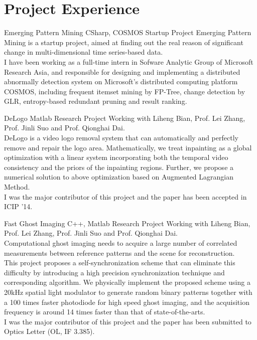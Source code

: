 \documentclass[11pt,a4paper]{moderncv}
\begin{document}
\section{Project Experience}

{Emerging Pattern Mining}
{CSharp, COSMOS}
{Startup Project}{}
{
Emerging Pattern Mining is a startup project, aimed at finding out the real reason of significant change in multi-dimensional time series-based data.\\
I have been working as a full-time intern in Sofware Analytic Group of Microsoft Research Asia, and responsible for designing and implementing a distributed abnormally detection system on Microsoft's distributed computing platform COSMOS, including frequent itemset mining by FP-Tree, change detection by GLR, entropy-based redundant pruning and result ranking.
}

\vspace*{0.2\baselineskip}
{DeLogo}
{Matlab}
{Research Project}{}
{Working with Liheng Bian, Prof. Lei Zhang, Prof. Jinli Suo and Prof. Qionghai Dai. \\
DeLogo is a video logo removal system that can automatically and perfectly remove and repair the logo area. Mathematically, we treat inpainting as a global optimization with a linear system incorporating both the temporal video consistency and the priors of the inpainting regions. Further, we propose a numerical solution to above optimization based on Augmented Lagrangian
Method. \\
I was the major contributor of this project and the paper has been accepted in ICIP '14.
}

\vspace*{0.2\baselineskip}
{Fast Ghost Imaging}
{C++, Matlab}
{Research Project}{}
{Working with Liheng Bian, Prof. Lei Zhang, Prof. Jinli Suo and Prof. Qionghai Dai. \\
Computational ghost imaging needs to acquire a large number of correlated measurements between reference patterns and the scene for reconstruction.\\
This project proposes a self-synchronization scheme that can eliminate this difficulty by introducing a high precision synchronization technique and corresponding algorithm. We physically implement the proposed scheme using a 20kHz spatial light modulator to generate random binary patterns together with a 100 times faster photodiode for high speed ghost imaging, and the acquisition frequency is around 14 times faster than that of state-of-the-arts. \\
I was the major contributor of this project and the paper has been submitted to Optics Letter (OL, IF 3.385).
}
\end{document}
